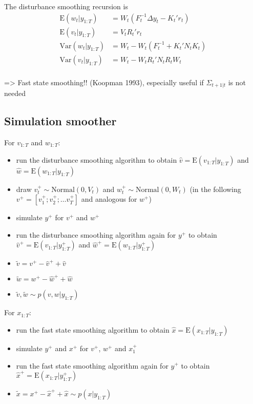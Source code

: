 \documentclass[12pt,a4paper]{scrartcl}
\newcommand{\E}{\mathrm{E}}
\newcommand{\Var}{\mathrm{Var}}
\begin{document}
The disturbance smoothing recursion is
\begin{align*}
\E(w_t|y_{1:T})   &= W_t (F_t^{-1} \Delta y_t - K_t' r_t)\\
\E(v_t|y_{1:T})   &= V_t R_t' r_t\\
\Var(w_t|y_{1:T}) &= W_t - W_t(F_t^{-1} + K_t'N_t K_t)\\
\Var(v_t|y_{1:T}) &= W_t - W_t R_t' N_t R_t W_t\\
\end{align*}

=> Fast state smoothing!! (Koopman 1993), especially useful if $\Sigma_{t+1|t}$ is not needed

\subsection{Simulation smoother}


For $v_{1:T}$ and $w_{1:T}$:

\begin{itemize}
	\item run the disturbance smoothing algorithm to obtain $\hat{v} = \E(v_{1:T}|y_{1:T})$ and $\hat{w}=\E(w_{1:T}|y_{1:T})$
	\item draw $v_t^+ \sim \mathrm{Normal}(0, V_t)$ and  $w_t^+ \sim \mathrm{Normal}(0, W_t)$ (in the following $v^+ = [v_1^+; v_2^+; \dots v_T^+] $ and analogous for $w^+$)
	\item simulate $y^+$ for $v^+$ and $w^+$
	\item run the disturbance smoothing algorithm again for $y^+$ to obtain $\hat{v}^+ = \E(v_{1:T}|y^+_{1:T})$ and $\hat{w}^+ =\E(w_{1:T}|y^+_{1:T})$
	\item $\tilde{v} = v^+ - \hat{v}^+ + \hat{v}$
	\item $\tilde{w} = w^+ - \hat{w}^+ + \hat{w}$
	\item $\tilde{v}, \tilde{w} \sim p(v, w|y_{1:T})$
\end{itemize}

For $x_{1:T}$:

\begin{itemize}
	\item run the fast state smoothing algorithm to obtain $\hat{x} = \E(x_{1:T}|y_{1:T})$
	\item simulate $y^+$ and $x^+$ for $v^+$, $w^+$ and $x_1^+$
	\item run the fast state smoothing algorithm again for $y^+$ to obtain $\hat{x}^+ = \E(x_{1:T}|y^+_{1:T})$
	\item $\tilde{x} = x^+ - \hat{x}^+ + \hat{x} \sim p(x|y_{1:T})$
\end{itemize}
\end{document}
